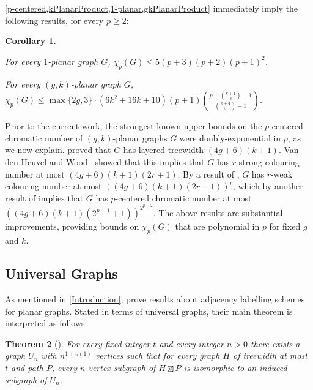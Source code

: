 \documentclass{patmorin}
\theoremstyle{plain}
\newtheorem{thm}{Theorem}
\newtheorem{cor}[thm]{Corollary}
\theoremstyle{definition}
\newcommand{\note}[2]{\noindent{\color{red}[#1:~#2]}}
\renewcommand{\ge}{\geqslant}
\renewcommand{\le}{\leqslant}
\begin{document}
\cref{p-centered,kPlanarProduct,1-planar,gkPlanarProduct} immediately imply the following results, for every $p\ge 2$:

\begin{cor}\quad
\begin{compactitem}
\item For every $1$-planar graph $G$,\; $ \chi_p(G)\le 5 (p+3)(p+2)(p+1)^2$.
\item For every $(g,k)$-planar graph $G$,\;
$\displaystyle \chi_p(G) \le \max\{2g,3\}\cdot(6k^2+16k+10) (p+1) \binom{p+\binom{k+4}{3}-1}{\binom{k+4}{3}-1}$.
 \end{compactitem}
\end{cor}

Prior to the current work, the strongest known upper bounds on the $p$-centered chromatic number of $(g,k)$-planar graphs $G$ were doubly-exponential in $p$, as we now explain. \citet{dujmovic.eppstein.ea:structure} proved that $G$ has layered treewidth $(4g+6)(k+1)$.
Van den Heuvel and Wood~\citep{vdHW18} showed that this implies that $G$  has $r$-strong colouring number at most $(4g + 6)(k + 1)(2r + 1)$. By a result of \citet{zhu:colouring}, $G$ has $r$-weak colouring number at most $( (4g + 6)(k + 1)(2r + 1) )^r$, which by another result of  \citet{zhu:colouring} implies that $G$ has  $p$-centered chromatic number at most $( (4g+6)(k+1)(2^{p-1} + 1) )^{2^{p-2}}$. The above results are substantial improvements, providing bounds on $\chi_p(G)$ that are polynomial in $p$ for fixed $g$ and $k$.


\subsection{Universal Graphs}

As mentioned in \cref{Introduction}, \citet{DEJGMM21} prove results about adjacency labelling schemes for planar graphs. Stated in terms of universal graphs, their main theorem is interpreted as follows:

\begin{thm}[\citep{DEJGMM21}]
	\label{Universal}
	For every fixed integer $t$ and every integer $n>0$ there exists a
	graph $U_n$ with $n^{1+o(1)}$ vertices such that for every graph $H$ of
	treewidth at most $t$ and path $P$, every $n$-vertex subgraph of $H\boxtimes P$ is isomorphic to an induced subgraph of $U_n$.
\end{thm}
\end{document}
